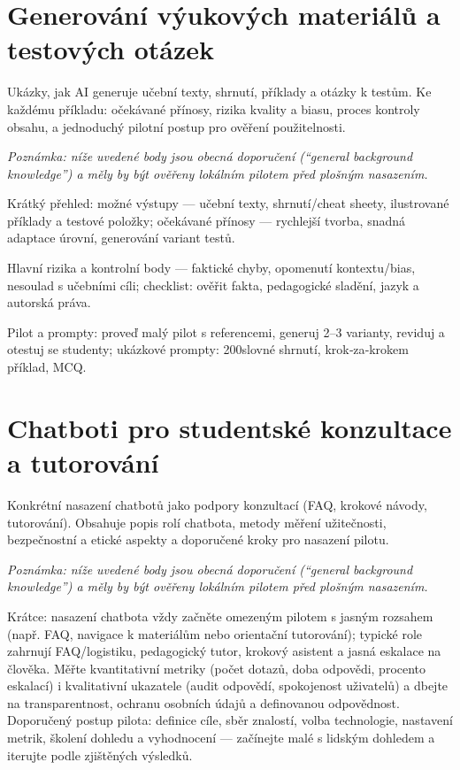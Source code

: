 \documentclass{report}%
\begin{document}
%
\section{Generování výukových materiálů a testových otázek}%
Ukázky, jak AI generuje učební texty, shrnutí, příklady a otázky k testům. Ke každému příkladu: očekávané přínosy, rizika kvality a biasu, proces kontroly obsahu, a jednoduchý pilotní postup pro ověření použitelnosti.%


%
\noindent\textit{Poznámka: níže uvedené body jsou obecná doporučení (``general background knowledge'') a měly by být ověřeny lokálním pilotem před plošným nasazením.}\medskip

Krátký přehled: možné výstupy — učební texty, shrnutí/cheat sheety, ilustrované příklady a testové položky; očekávané přínosy — rychlejší tvorba, snadná adaptace úrovní, generování variant testů.

Hlavní rizika a kontrolní body — faktické chyby, opomenutí kontextu/bias, nesoulad s učebními cíli; checklist: ověřit fakta, pedagogické sladění, jazyk a autorská práva.

Pilot a prompty: proveď malý pilot s referencemi, generuj 2–3 varianty, reviduj a otestuj se studenty; ukázkové prompty: 200slovné shrnutí, krok‑za‑krokem příklad, MCQ.%

%
\section{Chatboti pro studentské konzultace a tutorování}%
Konkrétní nasazení chatbotů jako podpory konzultací (FAQ, krokové návody, tutorování). Obsahuje popis rolí chatbota, metody měření užitečnosti, bezpečnostní a etické aspekty a doporučené kroky pro nasazení pilotu.%


%
\noindent\textit{Poznámka: níže uvedené body jsou obecná doporučení (``general background knowledge'') a měly by být ověřeny lokálním pilotem před plošným nasazením.}\medskip

Krátce: nasazení chatbota vždy začněte omezeným pilotem s jasným rozsahem (např. FAQ, navigace k materiálům nebo orientační tutorování); typické role zahrnují FAQ/logistiku, pedagogický tutor, krokový asistent a jasná eskalace na člověka. Měřte kvantitativní metriky (počet dotazů, doba odpovědi, procento eskalací) i kvalitativní ukazatele (audit odpovědí, spokojenost uživatelů) a dbejte na transparentnost, ochranu osobních údajů a definovanou odpovědnost. Doporučený postup pilota: definice cíle, sběr znalostí, volba technologie, nastavení metrik, školení dohledu a vyhodnocení — začínejte malé s lidským dohledem a iterujte podle zjištěných výsledků.%
\end{document}
